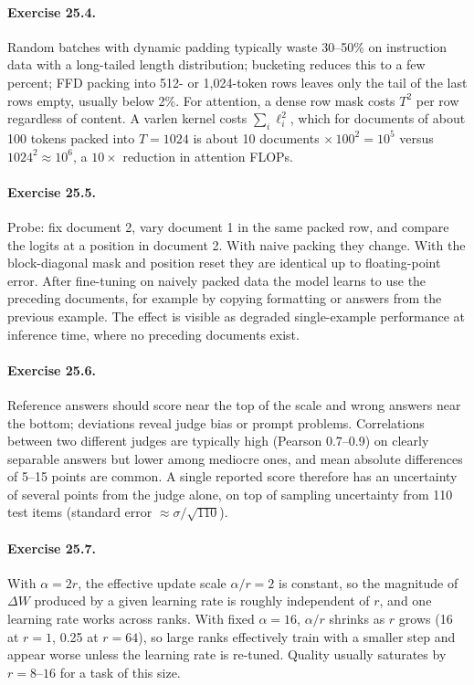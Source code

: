 \paragraph{Exercise 25.4.} Random batches with dynamic padding typically waste 30--50\% on
instruction data with a long-tailed length distribution; bucketing reduces this to a few
percent; FFD packing into 512- or 1{,}024-token rows leaves only the tail of the last
rows empty, usually below 2\%. For attention, a dense row mask costs $T^2$ per row
regardless of content. A varlen kernel costs $\sum_i\ell_i^2$, which for documents of
about 100 tokens packed into $T=1024$ is about 10 documents $\times\,100^2 = 10^5$
versus $1024^2\approx10^6$, a $10\times$ reduction in attention FLOPs.

\paragraph{Exercise 25.5.} Probe: fix document 2, vary document 1 in the same packed row,
and compare the logits at a position in document 2. With naive packing they change.
With the block-diagonal mask and position reset they are identical up to floating-point
error. After fine-tuning on naively packed data the model learns to use the preceding
documents, for example by copying formatting or answers from the previous example.
The effect is visible as degraded single-example performance at inference time, where
no preceding documents exist.

\paragraph{Exercise 25.6.} Reference answers should score near the top of the scale and
wrong answers near the bottom; deviations reveal judge bias or prompt problems.
Correlations between two different judges are typically high (Pearson 0.7--0.9) on
clearly separable answers but lower among mediocre ones, and mean absolute differences
of 5--15 points are common. A single reported score therefore has an uncertainty of
several points from the judge alone, on top of sampling uncertainty from 110 test
items (standard error $\approx\sigma/\sqrt{110}$).

\paragraph{Exercise 25.7.} With $\alpha=2r$, the effective update scale $\alpha/r=2$ is
constant, so the magnitude of $\Delta W$ produced by a given learning rate is roughly
independent of $r$, and one learning rate works across ranks. With fixed $\alpha=16$,
$\alpha/r$ shrinks as $r$ grows (16 at $r=1$, 0.25 at $r=64$), so large ranks
effectively train with a smaller step and appear worse unless the learning rate is
re-tuned. Quality usually saturates by $r=8$--$16$ for a task of this size.

